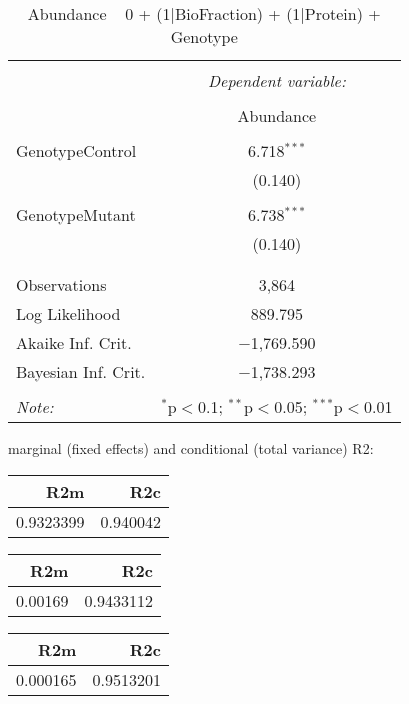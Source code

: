 \documentclass[11pt]{report}
\begin{document}
\begin{table}[!htbp] \centering 
  \caption{Abundance ~ 0 + (1|BioFraction) + (1|Protein) + Genotype} 
  \label{} 
\begin{tabular}{@{\extracolsep{5pt}}lc} 
\\[-1.8ex]\hline 
\hline \\[-1.8ex] 
 & \multicolumn{1}{c}{\textit{Dependent variable:}} \\ 
\cline{2-2} 
\\[-1.8ex] & Abundance \\ 
\hline \\[-1.8ex] 
 GenotypeControl & 6.718$^{***}$ \\ 
  & (0.140) \\ 
  & \\ 
 GenotypeMutant & 6.738$^{***}$ \\ 
  & (0.140) \\ 
  & \\ 
\hline \\[-1.8ex] 
Observations & 3,864 \\ 
Log Likelihood & 889.795 \\ 
Akaike Inf. Crit. & $-$1,769.590 \\ 
Bayesian Inf. Crit. & $-$1,738.293 \\ 
\hline 
\hline \\[-1.8ex] 
\textit{Note:}  & \multicolumn{1}{r}{$^{*}$p$<$0.1; $^{**}$p$<$0.05; $^{***}$p$<$0.01} \\ 
\end{tabular} 
\end{table} 
marginal (fixed effects) and conditional (total variance) R2:

\begin{tabular}{r|r}
\hline
R2m & R2c\\
\hline
0.9323399 & 0.940042\\
\hline
\end{tabular}

\begin{tabular}{r|r}
\hline
R2m & R2c\\
\hline
0.00169 & 0.9433112\\
\hline
\end{tabular}

\begin{tabular}{r|r}
\hline
R2m & R2c\\
\hline
0.000165 & 0.9513201\\
\hline
\end{tabular}
\end{document}
